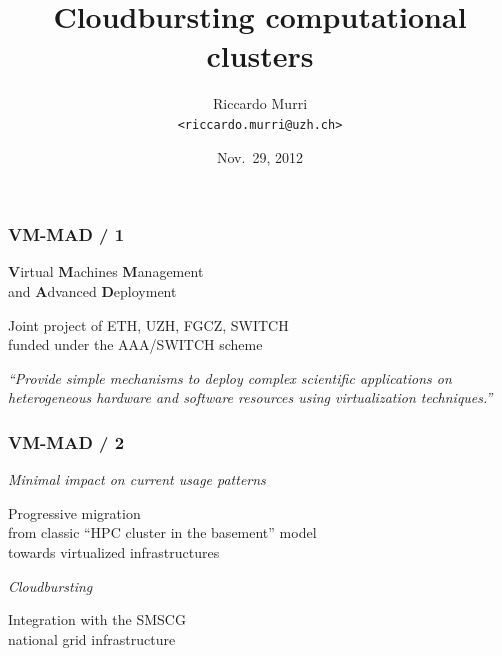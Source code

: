 \documentclass[english,serif,mathserif,xcolor=pdftex,dvipsnames,table]{beamer}
\title[VM-MAD]{%
  Cloudbursting computational clusters
}
\author[R.~Murri]{Riccardo Murri \\ \texttt{<riccardo.murri@uzh.ch>}}
\institute[GC3, Univ. of Zurich]{%
  \href{http://www.gc3.uzh.ch/}{GC3: Grid Computing Competence Center},
  \\
  \href{http://www.uzh.ch/}{University of Zurich}
}
\date{Nov.~29, 2012}
\begin{document}
\maketitle


\begin{frame}
  \frametitle{VM-MAD / 1}
  \begin{center}
    \textbf{V}irtual \textbf{M}achines \textbf{M}anagement 
    \\ and \textbf{A}dvanced \textbf{D}eployment

    \+
    Joint project of ETH, UZH, FGCZ, SWITCH \\ funded under the AAA/SWITCH scheme

    \+ 
    \emph{
      ``Provide simple mechanisms to deploy complex scientific
      applications on heterogeneous hardware and software resources
      using virtualization techniques.''
    }
  \end{center}
\end{frame}


\begin{frame}
  \frametitle{VM-MAD / 2}
  \begin{center}
    {\em Minimal impact on current usage patterns}

    \+ Progressive migration \\ from classic ``HPC cluster in the basement'' model \\ towards virtualized infrastructures

    \+ {\em Cloudbursting}

    \+ Integration with the SMSCG \\ national grid infrastructure 
  \end{center}
\end{frame}
\end{document}
